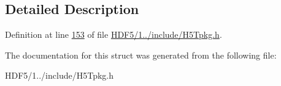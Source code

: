 \subsection{Detailed Description}


Definition at line \hyperlink{_h_d_f5_21_810_81_2include_2_h5_tpkg_8h_source_l00153}{153} of file \hyperlink{_h_d_f5_21_810_81_2include_2_h5_tpkg_8h_source}{H\+D\+F5/1../include/\+H5\+Tpkg.\+h}.



The documentation for this struct was generated from the following file\+:\begin{DoxyCompactItemize}
\item 
H\+D\+F5/1../include/\+H5\+Tpkg.\+h\end{DoxyCompactItemize}
